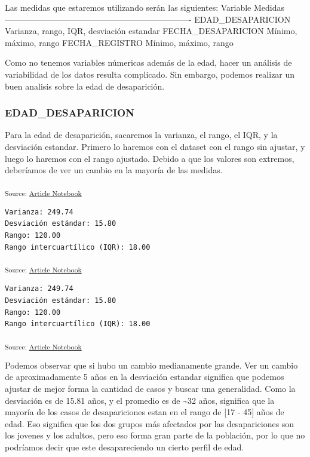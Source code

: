 \documentclass[
]{agujournal2019}
\begin{document}
Las medidas que estaremos utilizando serán las siguientes: \textbar{}
Variable \textbar{} Medidas \textbar{}
\textbar---------------------\textbar----------------------------------------------\textbar{}
\textbar{} EDAD\_DESAPARICION \textbar{} Varianza, rango, IQR,
desviación estandar \textbar{} \textbar{} FECHA\_DESAPARICION \textbar{}
Mínimo, máximo, rango \textbar{} \textbar{} FECHA\_REGISTRO \textbar{}
Mínimo, máximo, rango \textbar{}

Como no tenemos variables númericas además de la edad, hacer un análisis
de variabilidad de los datos resulta complicado. Sin embargo, podemos
realizar un buen analisis sobre la edad de desaparición.

\subsubsection{EDAD\_DESAPARICION}\label{edad_desaparicion-1}

Para la edad de desaparición, sacaremos la varianza, el rango, el IQR, y
la desviación estandar. Primero lo haremos con el dataset con el rango
sin ajustar, y luego lo haremos con el rango ajustado. Debido a que los
valores son extremos, deberíamos de ver un cambio en la mayoría de las
medidas.

\textsubscript{Source:
\href{https://Rou-uu.github.io/pruebaQuarto/index.qmd.html}{Article
Notebook}}

\begin{verbatim}
Varianza: 249.74
Desviación estándar: 15.80
Rango: 120.00
Rango intercuartílico (IQR): 18.00
\end{verbatim}

\textsubscript{Source:
\href{https://Rou-uu.github.io/pruebaQuarto/index.qmd.html}{Article
Notebook}}

\begin{verbatim}
Varianza: 249.74
Desviación estándar: 15.80
Rango: 120.00
Rango intercuartílico (IQR): 18.00
\end{verbatim}

\textsubscript{Source:
\href{https://Rou-uu.github.io/pruebaQuarto/index.qmd.html}{Article
Notebook}}

Podemos observar que si hubo un cambio medianamente grande. Ver un
cambio de aproximadamente 5 años en la desviación estandar significa que
podemos ajustar de mejor forma la cantidad de casos y buscar una
generalidad. Como la desviación es de 15.81 años, y el promedio es de
\textasciitilde32 años, significa que la mayoría de los casos de
desapariciones estan en el rango de {[}17 - 45{]} años de edad. Eso
significa que los dos grupos más afectados por las desapariciones son
los jovenes y los adultos, pero eso forma gran parte de la población,
por lo que no podríamos decir que este desapareciendo un cierto perfil
de edad.
\end{document}
